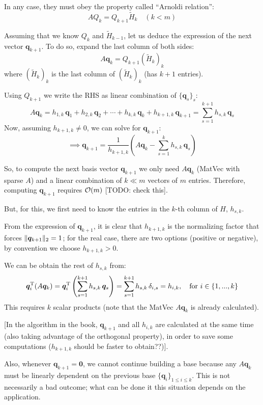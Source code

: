 \documentclass[
  12pt,
  paper=a4,
]{scrartcl} %
\begin{document}
In any case, they must obey the property called ``Arnoldi relation'':
\[
    \boxed{
        A Q_k = Q_{k+1} \tilde H_k
    }\quad (k<m)
\]

Assuming that we know $Q_k$ and $\tilde H_{k-1}$, let us deduce the expression of the next vector $\bm q_{k+1}$.
To do so, expand the last column of both sides:
\[
    A\bm q_k = Q_{k+1} (\tilde{H}_k)_k
\]
where $(\tilde{H}_k)_k$ is the last column of $(\tilde{H}_k)_k$ (has $k+1$ entries).

Using $Q_{k+1}$ we write the RHS as linear combination of $\{\bm q_s\}_s$:
\[
    A\bm q_k = h_{1,k}\,\bm q_1 + h_{2,k}\,\bm q_2 + \cdots + h_{k,k}\,\bm q_{k} + h_{k+1,k}\,\bm q_{k+1} = \sum_{s=1}^{k+1} h_{s,k}\,\bm q_s
\]
Now, assuming $h_{k+1,k}\neq 0$, we can solve for $\bm q_{k+1}$:
\[
\implies
    \bm q_{k+1} = \frac{1}{h_{k+1,k}}
    \left(
        A\bm q_k - \sum_{s=1}^{k} h_{s,k}\,\bm q_s
    \right)
\]

So, to compute the next basis vector $\bm q_{k+1}$ we only need $A\bm q_{k}$ (MatVec with sparse $A$) and a linear combination of $k\ll m$ vectors of $m$ entries. Therefore, computing $\bm q_{k+1}$ requires $\mathcal{O}(m)$ [TODO: check this].

But, for this, we first need to know the entries in the $k$-th column of $H$, $h_{s,k}$.

From the expression of $\bm q_{k+1}$, it is clear that $h_{k+1,k}$ is the normalizing factor that forces $\|\bm q_{k+1}\|_2=1$; for the real case, there are two options (positive or negative), by convention we choose $h_{k+1,k}>0$.

We can be obtain the rest of $h_{s,k}$ from:
\[
    \bm q_i^{\mathrm{T}} (A \bm q_k) =
    \bm q_i^{\mathrm{T}}\left(\sum_{s=1}^{k+1} h_{s,k}\,\bm q_s\right)
    =
    \sum_{s=1}^{k+1} h_{s,k}\,\delta_{i,s}
    = h_{i,k}
    ,\quad \text{for } i\in \{1,..., k\}
\]
This requires $k$ scalar products (note that the MatVec $A \bm q_k$ is already calculated).


[In the algorithm in the book, $\bm q_{k+1}$ and all $h_{i,k}$ are calculated at the same time (also taking advantage of the orthogonal property), in order to save some computations ($h_{k+1,k}$ should be faster to obtain??)].

Also, whenever $\bm q_{k+1}=\bm 0$, we cannot continue building a base because any $A\bm q_{k}$ must be linearly dependent on the previous base $\{\bm q_i\}_{1 \le i\le k}$. This is not necessarily a bad outcome; what can be done it this situation depends on the application.
\end{document}
